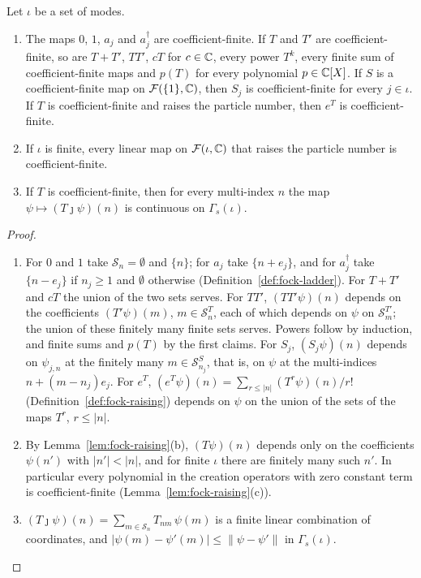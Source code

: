 \begin{vetbenv}
\begin{lemma}\label{lem:fock-coefffinite}
Let $\iota$ be a set of modes.
\begin{enumerate}
\item[(a)] The maps $0$, $1$, $a_j$ and $a_j^\dagger$ are coefficient-finite. If $T$ and $T'$ are
coefficient-finite, so are $T+T'$, $TT'$, $cT$ for $c\in\mathbb C$, every power $T^k$, every finite sum of
coefficient-finite maps and $p(T)$ for every polynomial $p\in\mathbb C[X]$. If $S$ is a coefficient-finite
map on $\mathcal F(\{1\},\mathbb C)$, then $S_j$ is coefficient-finite for every $j\in\iota$. If $T$ is
coefficient-finite and raises the particle number, then $e^T$ is coefficient-finite.
\item[(b)] If $\iota$ is finite, every linear map on $\mathcal F(\iota,\mathbb C)$ that raises the particle number
is coefficient-finite.
\item[(c)] If $T$ is coefficient-finite, then for every multi-index $n$ the map $\psi\mapsto
(T\jmath\psi)(n)$ is continuous on $\Gamma_s(\iota)$.
\end{enumerate}
\end{lemma}

\begin{proof}
\begin{enumerate}
\item[(a)] For $0$ and $1$ take $\mathcal S_n=\emptyset$ and $\{n\}$; for $a_j$ take $\{n+e_j\}$, and for
$a_j^\dagger$ take $\{n-e_j\}$ if $n_j\ge1$ and $\emptyset$ otherwise (Definition~\ref{def:fock-ladder}).
For $T+T'$ and $cT$ the union of the two sets serves. For $TT'$, $(TT'\psi)(n)$ depends on the
coefficients $(T'\psi)(m)$, $m\in\mathcal S^T_n$, each of which depends on $\psi$ on
$\mathcal S^{T'}_m$; the union of these finitely many finite sets serves. Powers follow by induction,
and finite sums and $p(T)$ by the first claims. For $S_j$, $(S_j\psi)(n)$ depends on $\psi_{j,n}$ at the
finitely many $m\in\mathcal S^S_{n_j}$, that is, on $\psi$ at the multi-indices $n+(m-n_j)e_j$. For
$e^T$, $(e^T\psi)(n)=\sum_{r\le\lvert n\rvert}(T^r\psi)(n)/r!$ (Definition~\ref{def:fock-raising}) depends
on $\psi$ on the union of the sets of the maps $T^r$, $r\le\lvert n\rvert$.
\item[(b)] By Lemma~\ref{lem:fock-raising}(b), $(T\psi)(n)$ depends only on the coefficients $\psi(n')$
with $\lvert n'\rvert<\lvert n\rvert$, and for finite $\iota$ there are finitely many such $n'$. In
particular every polynomial in the creation operators with zero constant term is coefficient-finite
(Lemma~\ref{lem:fock-raising}(c)).
\item[(c)] $(T\jmath\psi)(n)=\sum_{m\in\mathcal S_n}T_{nm}\,\psi(m)$ is a finite linear combination of
coordinates, and $\lvert\psi(m)-\psi'(m)\rvert\le\lVert\psi-\psi'\rVert$ in $\Gamma_s(\iota)$.\qedhere
\end{enumerate}
\end{proof}


\end{vetbenv}
